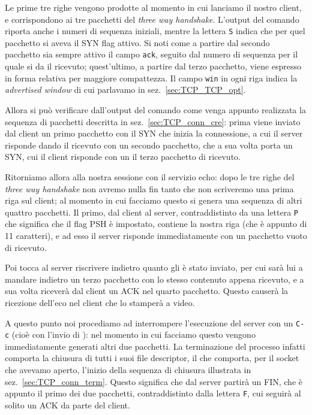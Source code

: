 Le prime tre righe vengono prodotte al momento in cui lanciamo il nostro
client, e corrispondono ai tre pacchetti del \textit{three way handshake}.
L'output del comando riporta anche i numeri di sequenza iniziali, mentre la
lettera \texttt{S} indica che per quel pacchetto si aveva il SYN flag attivo.
Si noti come a partire dal secondo pacchetto sia sempre attivo il campo
\texttt{ack}, seguito dal numero di sequenza per il quale si da il ricevuto;
quest'ultimo, a partire dal terzo pacchetto, viene espresso in forma relativa
per maggiore compattezza.  Il campo \texttt{win} in ogni riga indica la
\textit{advertised window} di cui parlavamo in sez.~\ref{sec:TCP_TCP_opt}.

Allora si può verificare dall'output del comando come venga appunto realizzata
la sequenza di pacchetti descritta in sez.~\ref{sec:TCP_conn_cre}: prima viene
inviato dal client un primo pacchetto con il SYN che inizia la connessione, a
cui il server risponde dando il ricevuto con un secondo pacchetto, che a sua
volta porta un SYN, cui il client risponde con un il terzo pacchetto di
ricevuto.

Ritorniamo allora alla nostra sessione con il servizio echo: dopo le tre righe
del \textit{three way handshake} non avremo nulla fin tanto che non scriveremo
una prima riga sul client; al momento in cui facciamo questo si genera una
sequenza di altri quattro pacchetti. Il primo, dal client al server,
contraddistinto da una lettera \texttt{P} che significa che il flag PSH è
impostato, contiene la nostra riga (che è appunto di 11 caratteri), e ad esso
il server risponde immediatamente con un pacchetto vuoto di ricevuto.

Poi tocca al server riscrivere indietro quanto gli è stato inviato, per cui
sarà lui a mandare indietro un terzo pacchetto con lo stesso contenuto appena
ricevuto, e a sua volta riceverà dal client un ACK nel quarto pacchetto.
Questo causerà la ricezione dell'eco nel client che lo stamperà a video.

A questo punto noi procediamo ad interrompere l'esecuzione del server con un
\texttt{C-c} (cioè con l'invio di ): nel momento in cui
facciamo questo vengono immediatamente generati altri due pacchetti. La
terminazione del processo infatti comporta la chiusura di tutti i suoi file
descriptor, il che comporta, per il socket che avevamo aperto, l'inizio della
sequenza di chiusura illustrata in sez.~\ref{sec:TCP_conn_term}.  Questo
significa che dal server partirà un FIN, che è appunto il primo dei due
pacchetti, contraddistinto dalla lettera \texttt{F}, cui seguirà al solito un
ACK da parte del client.  

